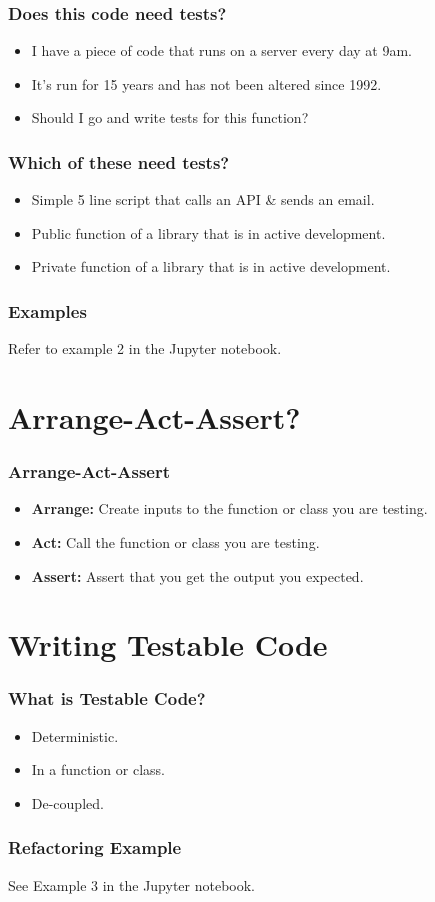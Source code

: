 \documentclass{beamer}
\begin{document}
\begin{frame}
	\frametitle{Does this code need tests?}
	
	\begin{itemize}
\item	I have a piece of code that runs on a server every day at 9am.\\ 
	
\item 	It's run for 15 years and has not been altered since 1992.\\
	
\item	Should I go and write tests for this function?
\end{itemize}
\end{frame}

\begin{frame}
	\frametitle{Which of these need tests?}
	
	\begin{itemize}
		\item Simple 5 line script that calls an API \& sends an email.
		\item  Public function of a library that is in active development.
		\item Private function of a library that is in active development.
	\end{itemize}
\end{frame}

\begin{frame}
	\frametitle{Examples}
	Refer to example 2 in the Jupyter notebook.
\end{frame}


\section{Arrange-Act-Assert?}
\begin{frame}
	\frametitle{Arrange-Act-Assert}
	\begin{itemize}
		\item \textbf{Arrange:} Create inputs to the function or class you are testing.
		\item \textbf{Act:} Call the function or class you are testing.
		\item \textbf{Assert:} Assert that you get the output you expected.
	\end{itemize}
\end{frame}


\section{Writing Testable Code}
\begin{frame}
	\frametitle{What is Testable Code?}
	
	\begin{itemize}
		\item Deterministic. \pause
		\item In a function or class. \pause
		\item De-coupled.
	\end{itemize}
	
\end{frame}

\begin{frame}
	\frametitle{Refactoring Example}
	See Example 3 in the Jupyter notebook.
\end{frame}
\end{document}
